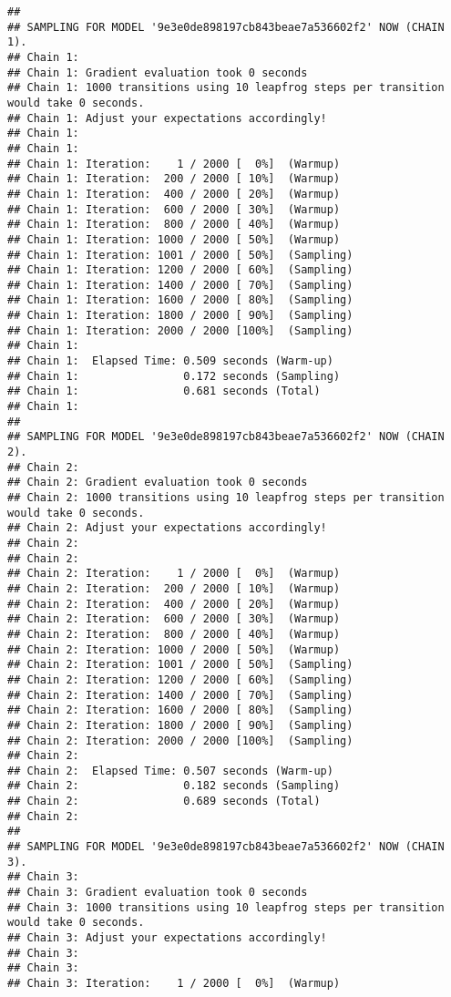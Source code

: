 \documentclass[
]{article}
\begin{document}
\begin{verbatim}
## 
## SAMPLING FOR MODEL '9e3e0de898197cb843beae7a536602f2' NOW (CHAIN 1).
## Chain 1: 
## Chain 1: Gradient evaluation took 0 seconds
## Chain 1: 1000 transitions using 10 leapfrog steps per transition would take 0 seconds.
## Chain 1: Adjust your expectations accordingly!
## Chain 1: 
## Chain 1: 
## Chain 1: Iteration:    1 / 2000 [  0%]  (Warmup)
## Chain 1: Iteration:  200 / 2000 [ 10%]  (Warmup)
## Chain 1: Iteration:  400 / 2000 [ 20%]  (Warmup)
## Chain 1: Iteration:  600 / 2000 [ 30%]  (Warmup)
## Chain 1: Iteration:  800 / 2000 [ 40%]  (Warmup)
## Chain 1: Iteration: 1000 / 2000 [ 50%]  (Warmup)
## Chain 1: Iteration: 1001 / 2000 [ 50%]  (Sampling)
## Chain 1: Iteration: 1200 / 2000 [ 60%]  (Sampling)
## Chain 1: Iteration: 1400 / 2000 [ 70%]  (Sampling)
## Chain 1: Iteration: 1600 / 2000 [ 80%]  (Sampling)
## Chain 1: Iteration: 1800 / 2000 [ 90%]  (Sampling)
## Chain 1: Iteration: 2000 / 2000 [100%]  (Sampling)
## Chain 1: 
## Chain 1:  Elapsed Time: 0.509 seconds (Warm-up)
## Chain 1:                0.172 seconds (Sampling)
## Chain 1:                0.681 seconds (Total)
## Chain 1: 
## 
## SAMPLING FOR MODEL '9e3e0de898197cb843beae7a536602f2' NOW (CHAIN 2).
## Chain 2: 
## Chain 2: Gradient evaluation took 0 seconds
## Chain 2: 1000 transitions using 10 leapfrog steps per transition would take 0 seconds.
## Chain 2: Adjust your expectations accordingly!
## Chain 2: 
## Chain 2: 
## Chain 2: Iteration:    1 / 2000 [  0%]  (Warmup)
## Chain 2: Iteration:  200 / 2000 [ 10%]  (Warmup)
## Chain 2: Iteration:  400 / 2000 [ 20%]  (Warmup)
## Chain 2: Iteration:  600 / 2000 [ 30%]  (Warmup)
## Chain 2: Iteration:  800 / 2000 [ 40%]  (Warmup)
## Chain 2: Iteration: 1000 / 2000 [ 50%]  (Warmup)
## Chain 2: Iteration: 1001 / 2000 [ 50%]  (Sampling)
## Chain 2: Iteration: 1200 / 2000 [ 60%]  (Sampling)
## Chain 2: Iteration: 1400 / 2000 [ 70%]  (Sampling)
## Chain 2: Iteration: 1600 / 2000 [ 80%]  (Sampling)
## Chain 2: Iteration: 1800 / 2000 [ 90%]  (Sampling)
## Chain 2: Iteration: 2000 / 2000 [100%]  (Sampling)
## Chain 2: 
## Chain 2:  Elapsed Time: 0.507 seconds (Warm-up)
## Chain 2:                0.182 seconds (Sampling)
## Chain 2:                0.689 seconds (Total)
## Chain 2: 
## 
## SAMPLING FOR MODEL '9e3e0de898197cb843beae7a536602f2' NOW (CHAIN 3).
## Chain 3: 
## Chain 3: Gradient evaluation took 0 seconds
## Chain 3: 1000 transitions using 10 leapfrog steps per transition would take 0 seconds.
## Chain 3: Adjust your expectations accordingly!
## Chain 3: 
## Chain 3: 
## Chain 3: Iteration:    1 / 2000 [  0%]  (Warmup)

\end{verbatim}
\end{document}
